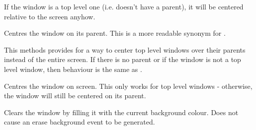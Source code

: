 
If the window is a top level one (i.e. doesn't have a parent), it will be
centered relative to the screen anyhow.




\label{wxwindowcentreonparent}


Centres the window on its parent. This is a more readable synonym for
.




This methods provides for a way to center top level windows over their
parents instead of the entire screen.  If there is no parent or if the
window is not a top level window, then behaviour is the same as
.




\label{wxwindowcentreonscreen}


Centres the window on screen. This only works for top level windows -
otherwise, the window will still be centered on its parent.






\label{wxwindowclearbackground}


Clears the window by filling it with the current background colour. Does not
cause an erase background event to be generated.


